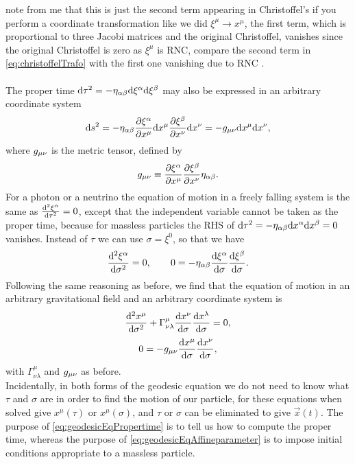 note from me that this is just the second term appearing in Christoffel's if you perform a coordinate transformation like we did $\xi^\mu \rightarrow x^\mu$, the first term, which is proportional to three Jacobi matrices and the original Christoffel, vanishes since the original Christoffel is zero as $\xi^\mu$ is RNC, compare the second term in \ref{eq:christoffelTrafo} with the first one vanishing due to RNC .\\
\\
The proper time $\mathrm{d} \tau^2 = - \eta_{\alpha \beta} \mathrm{d} \xi^\alpha \mathrm{d} \xi^\beta$ may also be expressed in an arbitrary coordinate system
\begin{equation}
	\mathrm{d} s^2 = - \eta_{\alpha \beta} \frac{\partial \xi^\alpha}{\partial x^\mu} \mathrm{d} x^\mu \frac{\partial \xi^\beta}{\partial x^\nu} \mathrm{d} x^\nu = - g_{\mu \nu} \mathrm{d} x^\mu \mathrm{d} x^\nu,
\end{equation}
where $g_{\mu \nu}$ is the metric tensor, defined by
\begin{equation}
\label{eq:geodesicEqPropertime}
g_{\mu \nu}\equiv \frac{\partial \xi^\alpha}{\partial x^\mu} \frac{\partial \xi^\beta}{\partial x^\nu} \eta_{\alpha \beta}.
\end{equation}
For a photon or a neutrino the equation of motion in a freely falling system is the same as $\frac{\mathrm{d}^2 \xi^\alpha}{\mathrm{d} \tau^2} =0$, except that the independent variable cannot be taken as the proper time, because for massless particles the RHS of $\mathrm{d} \tau^2 = - \eta_{\alpha \beta} \mathrm{d} x^\alpha \mathrm{d} x^\beta =0$ vanishes. Instead of $\tau$ we can use $\sigma=\xi^0$, so that we have
\begin{equation}
	\frac{\mathrm{d}^2 \xi^\alpha}{\mathrm{d} \sigma^2} = 0, \qquad 0 = - \eta_{\alpha \beta} \frac{\mathrm{d} \xi^\alpha}{\mathrm{d} \sigma} \frac{\mathrm{d} \xi^\beta}{\mathrm{d} \sigma}.
\end{equation}
Following the same reasoning as before, we find that the equation of motion in an arbitrary gravitational field and an arbitrary coordinate system is
\begin{equation}
	\frac{\mathrm{d}^2 x^\mu}{\mathrm{d} \sigma^2} + \Gamma^\mu_{\nu \lambda} \frac{\mathrm{d} x^\nu}{\mathrm{d} \sigma} \frac{\mathrm{d} x^\lambda}{\mathrm{d} \sigma} = 0,
\end{equation}
\begin{equation}
\label{eq:geodesicEqAffineparameter}
	 0=-g_{\mu \nu} \frac{\mathrm{d} x^\mu}{\mathrm{d} \sigma} \frac{\mathrm{d} x^\nu}{\mathrm{d} \sigma},
\end{equation}
with $\Gamma^\mu_{\nu \lambda}$ and $g_{\mu \nu}$ as before. \\
Incidentally, in both forms of the geodesic equation we do not need to know what $\tau$ and $\sigma$ are in order to find the motion of our particle, for these equations when solved give $x^\mu(\tau)$ or $x^\mu(\sigma)$, and $\tau$ or $\sigma$ can be eliminated to give $\vec{x}(t)$. The purpose of \ref{eq:geodesicEqPropertime} is to tell us how to compute the proper time, whereas the purpose of \ref{eq:geodesicEqAffineparameter} is to impose initial conditions appropriate to a massless particle.\\
